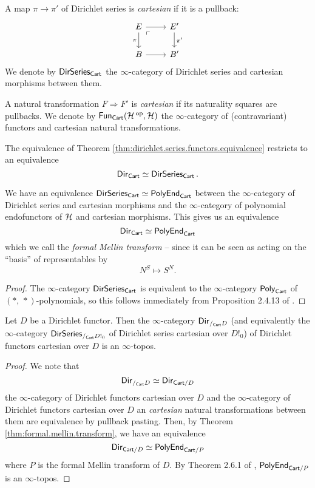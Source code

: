 \begin{defn}
A map $\pi \to \pi'$ of Dirichlet series is \emph{cartesian} if it
is a pullback:
\[
  \begin{tikzcd}
    E \arrow[d, "\pi"'] \arrow[r] \arrow[dr, phantom, "\ulcorner" very near
    start] & E' \arrow[d, "\pi'"] \\
    B \arrow[r] & B'
  \end{tikzcd}
\]
We denote by $\operatorname{\mathsf{{DirSeries}}}_{\mathsf{{Cart}}}$ the $\infty$-category of Dirichlet
series and cartesian morphisms between them.

A natural transformation $F \Rightarrow F'$ is \emph{cartesian} if its
naturality squares are pullbacks. We denote by $\operatorname{\mathsf{{Fun}}}_{\mathsf{{Cart}}}(\operatorname{\mathcal{H}}\operatorname{^\text{op}}, \operatorname{\mathcal{H}})$
the $\infty$-category of (contravariant) functors and cartesian natural transformations.
\end{defn}

\begin{prop}
The equivalence of Theorem \ref{thm:dirichlet.series.functors.equivalence}
restricts to an equivalence
$$\operatorname{\mathsf{{Dir}}}_{\mathsf{{Cart}}} \simeq \operatorname{\mathsf{{DirSeries}}}_{\mathsf{{Cart}}}.$$
\end{prop}

\begin{thm}\label{thm:formal.mellin.transform}
We have an equivalence $\operatorname{\mathsf{{DirSeries}}}_{\mathsf{{Cart}}} \simeq
\mathsf{{PolyEnd}}_{\mathsf{{Cart}}}$ between the $\infty$-category of Dirichlet series
and cartesian morphisms and the $\infty$-category of polynomial endofunctors of
$\operatorname{\mathcal{H}}$ and cartesian morphisms. This gives us an equivalence
$$\operatorname{\mathsf{{Dir}}}_{\mathsf{{Cart}}} \simeq \mathsf{{PolyEnd}}_{\mathsf{{Cart}}}$$
which we call the \emph{formal Mellin transform} -- since it can be seen as
acting on the ``basis'' of representables by
$$N^S \mapsto S^N.$$
\end{thm}
\begin{proof}
The $\infty$-category $\operatorname{\mathsf{{DirSeries}}}_{\mathsf{{Cart}}}$ is equivalent to the $\infty$-category
$\mathsf{{Poly}}_{\mathsf{{Cart}}}$ of $(\ast,\, \ast)$-polynomials, so this follows immediately from Proposition 2.4.13 of \cite{GHK:Analytic.Monads}.
\end{proof}

\begin{cor}
Let $D$ be a Dirichlet functor. Then the $\infty$-category $\operatorname{\mathsf{{Dir}}}_{/_{\mathsf{{Cart}}} D}$
(and equivalently the $\infty$-category $\operatorname{\mathsf{{DirSeries}}}_{/_{\mathsf{{Cart}}} D!_0}$ of
Dirichlet series cartesian over $D!_0$) of
Dirichlet functors cartesian over $D$ is an $\infty$-topos.
\end{cor}
\begin{proof}
  We note that
  $$\operatorname{\mathsf{{Dir}}}_{/_{\mathsf{{Cart}}} D} \simeq \operatorname{\mathsf{{Dir}}}_{\mathsf{{Cart}}/D}$$
  the $\infty$-category of Dirichlet functors cartesian over $D$ and the
  $\infty$-category of Dirichlet functors cartesian over $D$ an \emph{cartesian}
  natural transformations between them are equivalence by pullback pasting.
  Then, by Theorem \ref{thm:formal.mellin.transform}, we have an equivalence
  $$\operatorname{\mathsf{{Dir}}}_{\mathsf{{Cart}}/D} \simeq \mathsf{{PolyEnd}}_{\mathsf{{Cart}}/P}$$
  where $P$ is the formal Mellin transform of $D$. By Theorem 2.6.1 of
  \cite{GHK:Analytic.Monads}, $\mathsf{{PolyEnd}}_{\mathsf{{Cart}}/P}$ is an $\infty$-topos.
\end{proof}

